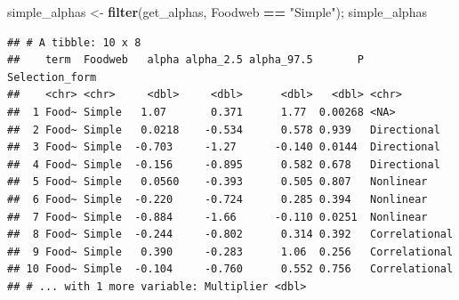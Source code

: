\documentclass[]{elsarticle} %
\newenvironment{Shaded}{\begin{snugshade}}{\end{snugshade}}
\newcommand{\KeywordTok}[1]{\textcolor[rgb]{0.13,0.29,0.53}{\textbf{#1}}}
\newcommand{\StringTok}[1]{\textcolor[rgb]{0.31,0.60,0.02}{#1}}
\newcommand{\OperatorTok}[1]{\textcolor[rgb]{0.81,0.36,0.00}{\textbf{#1}}}
\newcommand{\NormalTok}[1]{#1}
\begin{document}
\begin{Shaded}
\begin{Highlighting}[]
\NormalTok{simple_alphas <-}\StringTok{ }\KeywordTok{filter}\NormalTok{(get_alphas, Foodweb }\OperatorTok{==}\StringTok{ "Simple"}\NormalTok{); simple_alphas}
\end{Highlighting}
\end{Shaded}

\begin{verbatim}
## # A tibble: 10 x 8
##    term  Foodweb   alpha alpha_2.5 alpha_97.5       P Selection_form
##    <chr> <chr>     <dbl>     <dbl>      <dbl>   <dbl> <chr>         
##  1 Food~ Simple   1.07       0.371      1.77  0.00268 <NA>          
##  2 Food~ Simple   0.0218    -0.534      0.578 0.939   Directional   
##  3 Food~ Simple  -0.703     -1.27      -0.140 0.0144  Directional   
##  4 Food~ Simple  -0.156     -0.895      0.582 0.678   Directional   
##  5 Food~ Simple   0.0560    -0.393      0.505 0.807   Nonlinear     
##  6 Food~ Simple  -0.220     -0.724      0.285 0.394   Nonlinear     
##  7 Food~ Simple  -0.884     -1.66      -0.110 0.0251  Nonlinear     
##  8 Food~ Simple  -0.244     -0.802      0.314 0.392   Correlational 
##  9 Food~ Simple   0.390     -0.283      1.06  0.256   Correlational 
## 10 Food~ Simple  -0.104     -0.760      0.552 0.756   Correlational 
## # ... with 1 more variable: Multiplier <dbl>
\end{verbatim}
\end{document}
